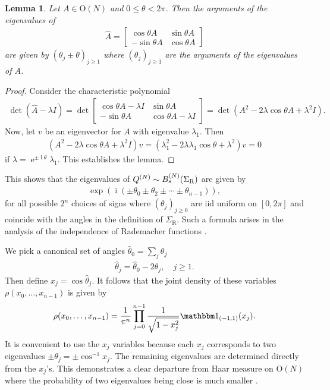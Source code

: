 \documentclass{amsart}
\newtheorem{lemma}[theorem]{Lemma}
\theoremstyle{definition}
\theoremstyle{remark}
\numberwithin{equation}{section}
\DeclareMathOperator{\E}{e}
\DeclareMathOperator{\I}{i}
\begin{document}
\begin{lemma}
Let $A \in \mathrm O(N)$ and $0 \leq \theta < 2 \pi$.  Then the arguments of the eigenvalues of
\begin{align}
\hat A = \begin{bmatrix} \cos \theta A & \sin \theta A \\ - \sin \theta A & \cos \theta A \end{bmatrix}
\end{align}
are given by $(\theta_j \pm \theta)_{j \geq 1}$ where $(\theta_j)_{j \geq 1}$ are the arguments of the eigenvalues of $A$.
\end{lemma}
\begin{proof}
Consider the characteristic polynomial
\begin{align}
\det (\hat A - \lambda I) = \det \begin{bmatrix} \cos \theta A - \lambda I & \sin \theta A \\ - \sin \theta A & \cos \theta A - \lambda I\end{bmatrix} = \det ( A^2    - 2 \lambda \cos \theta A + \lambda^2 I).
\end{align}
Now, let $v$ be an eigenvector for $A$ with eigenvalue $\lambda_1$.  Then
\begin{align}
( A^2 - 2 \lambda \cos \theta A + \lambda^2 I)v = (\lambda_1^2  - 2 \lambda \lambda_1 \cos \theta  + \lambda^2) v = 0
\end{align}
if $\lambda = \E^{ \pm \I \theta } \lambda_1$. This establishes the lemma.
\end{proof}

This shows that the eigenvalues of $Q^{(N)} \sim B_s^{(N)}(\Sigma_{\mathrm{R}})$ are given by
\begin{align}
\exp \left( \I ( \pm \theta_0 \pm \theta_2 \pm \cdots \pm \theta_{n-1}) \right),
\end{align}
for all possible $2^n$ choices of signs where $(\theta_j)_{j \geq 0}$ are iid uniform on $[0, 2\pi]$ and coincide with the angles in the definition of $\Sigma_{\mathrm{R}}$. Such a formula arises in the analysis of the independence of Rademacher functions \cite[Chapter 1]{Kac1959}.  


We pick a canonical set of angles $\hat \theta_0 = \sum_j \theta_j$
\begin{align}
\hat \theta_j = \hat \theta_0 - 2 \theta_j, \quad j \geq 1.
\end{align}
Then define $x_j = \cos \hat \theta_j$.  It follows that the joint density of these variables $\rho(x_0,\ldots,x_{n-1})$ is given by
\begin{align}
\rho(x_0,\ldots,x_{n-1}) = \frac{1}{\pi^n} \prod_{j=0}^{n-1} \frac{1}{\sqrt{1-x_j^2}} \mathbbm 1_{(-1,1)}(x_j).
\end{align}
It is convenient to use the $x_j$ variables because each $x_j$ corresponds to two eigenvalues $\pm \theta_j = \pm \cos^{-1} x_j$.  The remaining eigenvalues are determined directly from the $x_j$'s.  This demonstrates a clear departure from Haar measure on $\mathrm O(N)$ where the probability of two eigenvalues being close is much smaller \cite{Forrester2010}.
\end{document}
